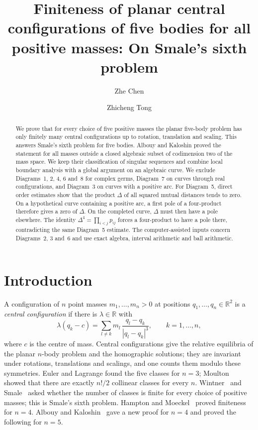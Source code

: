 \documentclass[11pt]{amsart}
\title[Five-body central configurations]{Finiteness of planar central configurations of five
bodies for all positive masses: On Smale's sixth problem}
\author{Zhe Chen}
\author{Zhicheng Tong}
\theoremstyle{definition}
\theoremstyle{remark}
\newcommand{\R}{\mathbb{R}}
\begin{document}
\begin{abstract}
{
We prove that for every choice of five positive masses the planar five-body problem has only
finitely many central configurations up to rotation, translation and scaling.  This answers
Smale's sixth problem for five bodies.  Albouy and Kaloshin proved the statement for all masses
outside a closed algebraic subset of codimension two of the mass space.  We keep their
classification of singular sequences and combine local boundary analysis with a global
argument on an algebraic curve.  We exclude Diagrams~1, 2, 4, 6 and~8 for complex germs,
Diagram~7 on curves through real configurations, and Diagram~3 on curves with a positive arc.  For Diagram~5, direct order estimates show that the product
$\Delta$ of all squared mutual distances tends to zero.  On a hypothetical curve containing a
positive arc, a first pole of a four-product therefore gives a zero of $\Delta$.  On the
completed curve, $\Delta$ must then have a pole elsewhere.  The identity
$\Delta^4=\prod_{i<j}p_{ij}$ forces a four-product to have a pole there, contradicting the same
Diagram~5 estimate.  The computer-assisted inputs concern Diagrams~2, 3 and~6 and use exact
algebra, interval arithmetic and ball arithmetic.
}
\end{abstract}

\maketitle

\tableofcontents


\section{Introduction}\label{sec:intro}

A configuration of $n$ point masses $m_1,\dots,m_n>0$ at positions $q_1,\dots,q_n\in\R^2$ is a
\emph{central configuration} if there is $\lambda\in\R$ with
\[
  \lambda (q_k-c) = \sum_{l\neq k} m_l\,\frac{q_l-q_k}{|q_l-q_k|^3},\qquad k=1,\dots,n,
\]
where $c$ is the centre of mass.  Central configurations give the relative equilibria of the
planar $n$-body problem and the homographic solutions; they are invariant under rotations,
translations and scalings, and one counts them modulo these symmetries.  Euler and Lagrange
found the five classes for $n=3$; Moulton~\cite{Moulton} showed that there are exactly $n!/2$
collinear classes for every $n$.  Wintner~\cite{Wintner} and Smale~\cite{Smale} asked whether
the number of classes is finite for every choice of positive masses; this is Smale's sixth
problem.  Hampton and Moeckel~\cite{HM} proved finiteness for $n=4$.  Albouy and
Kaloshin~\cite{AK} gave a new proof for $n=4$ and proved the following for $n=5$.
\end{document}
